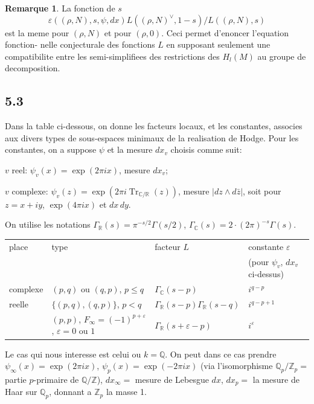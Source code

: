 \documentclass[12pt,a4paper]{article}
\theoremstyle{plain}
\theoremstyle{definition}
\newtheorem{remark}[definition]{Remarque}
\theoremstyle{remark}
\DeclareMathOperator{\Tr}{Tr}
\newcommand{\Q}{\mathbb{Q}}
\newcommand{\R}{\mathbb{R}}
\newcommand{\C}{\mathbb{C}}
\newcommand{\Z}{\mathbb{Z}}
\begin{document}
\begin{remark}
La fonction de $s$
\[
\varepsilon((\rho, N), s, \psi, dx) L((\rho, N)^\vee, 1-s) / L((\rho, N), s)
\]
est la meme pour $(\rho, N)$ et pour $(\rho, 0)$. Ceci permet d'enoncer l'equation fonction-
nelle conjecturale des fonctions $L$ en supposant seulement une compatibilite entre
les semi-simplifiees des restrictions des $H_l(M)$ au groupe de decomposition.
\end{remark}

\subsection*{5.3}

Dans la table ci-dessous, on donne les facteurs locaux, et les constantes, associes
aux divers types de sous-espaces minimaux de la realisation de Hodge. Pour les
constantes, on a suppose $\psi$ et la mesure $dx_v$ choisis comme suit:

$v$ reel: $\psi_v(x) = \exp(2\pi i x)$, mesure $dx_v$;

$v$ complexe: $\psi_v(z) = \exp(2\pi i \Tr_{\C/\R}(z))$, mesure $|dz \wedge d\bar{z}|$,
soit pour $z = x + iy$, $\exp(4\pi i x)$ et $dx \, dy$.

On utilise les notations $\Gamma_\R(s) = \pi^{-s/2} \Gamma(s/2)$, $\Gamma_\C(s) = 2 \cdot (2\pi)^{-s} \Gamma(s)$.

\begin{center}
\begin{tabular}{llll}
\toprule
place & type & facteur $L$ & constante $\varepsilon$ \\
& & & (pour $\psi_v$, $dx_v$ ci-dessus) \\
\midrule
complexe & $(p,q)$ ou $(q,p)$, $p \leq q$ & $\Gamma_\C(s-p)$ & $i^{q-p}$ \\
reelle & $\{(p,q), (q,p)\}$, $p < q$ & $\Gamma_\R(s-p)\Gamma_\R(s-q)$ & $i^{q-p+1}$ \\
& $(p,p)$, $F_\infty = (-1)^{p+\varepsilon}$, $\varepsilon = 0$ ou $1$ & $\Gamma_\R(s+\varepsilon-p)$ & $i^\varepsilon$ \\
\bottomrule
\end{tabular}
\end{center}

Le cas qui nous interesse est celui ou $k = \Q$. On peut dans ce cas prendre
$\psi_\infty(x) = \exp(2\pi i x)$, $\psi_p(x) = \exp(-2\pi i x)$ (via l'isomorphisme $\Q_p/\Z_p =$
partie $p$-primaire de $\Q/\Z$), $dx_\infty =$ mesure de Lebesgue $dx$, $dx_p =$ la mesure de
Haar sur $\Q_p$, donnant a $\Z_p$ la masse 1.
\end{document}
